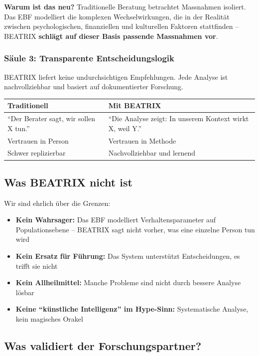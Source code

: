 \documentclass[11pt,a4paper]{article}
\begin{document}
\textbf{Warum ist das neu?} Traditionelle Beratung betrachtet Massnahmen isoliert. Das EBF modelliert die komplexen Wechselwirkungen, die in der Realität zwischen psychologischen, finanziellen und kulturellen Faktoren stattfinden -- BEATRIX \textbf{schlägt auf dieser Basis passende Massnahmen vor}.

\subsubsection{Säule 3: Transparente Entscheidungslogik}

BEATRIX liefert keine undurchsichtigen Empfehlungen. Jede Analyse ist nachvollziehbar und basiert auf dokumentierter Forschung.

\begin{table}[h]
\centering
\begin{tabular}{@{}L{6cm}L{7cm}@{}}
\toprule
\textbf{Traditionell} & \textbf{Mit BEATRIX} \\
\midrule
``Der Berater sagt, wir sollen X tun.'' & ``Die Analyse zeigt: In unserem Kontext wirkt X, weil Y.'' \\
Vertrauen in Person & Vertrauen in Methode \\
Schwer replizierbar & Nachvollziehbar und lernend \\
\bottomrule
\end{tabular}
\end{table}

\subsection{Was BEATRIX nicht ist}

Wir sind ehrlich über die Grenzen:

\begin{itemize}
    \item \textbf{Kein Wahrsager:} Das EBF modelliert Verhaltensparameter auf Populationsebene -- BEATRIX sagt nicht vorher, was eine einzelne Person tun wird
    \item \textbf{Kein Ersatz für Führung:} Das System unterstützt Entscheidungen, es trifft sie nicht
    \item \textbf{Kein Allheilmittel:} Manche Probleme sind nicht durch bessere Analyse lösbar
    \item \textbf{Keine ``künstliche Intelligenz'' im Hype-Sinn:} Systematische Analyse, kein magisches Orakel
\end{itemize}

\subsection{Was validiert der Forschungspartner?}
\end{document}
